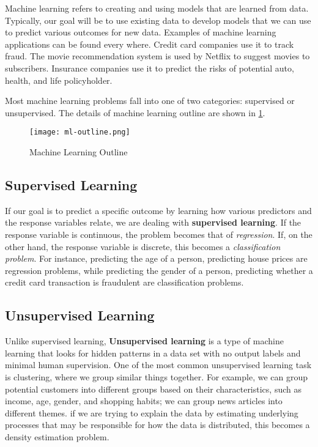 Machine learning refers to creating and using models that are learned from data.
Typically, our goal will be to use existing data to develop models that we can
use to predict various outcomes for new data. Examples of machine learning
applications can be found every where. Credit card companies use it to track
fraud.  The movie recommendation system is used by Netflix to suggest movies to
subscribers. Insurance companies use it to predict the risks of potential auto,
health, and life policyholder.

Most machine learning problems fall into one of two categories: supervised or
unsupervised. The details of machine learning outline are shown in
\ref{fig:ml-outline}.

\begin{figure}[H]\centering
    \texttt{[image: ml-outline.png]}
    \caption{Machine Learning Outline}
    \label{fig:ml-outline}
\end{figure}

\subsection{Supervised Learning}

If our goal is to predict a specific outcome by learning how various predictors
and the response variables relate, we are dealing with \textbf{supervised
learning}. If the response variable is continuous, the problem becomes that of
\textit{regression}. If, on the other hand, the response variable is discrete,
this becomes a \textit{classification problem}. For instance, predicting the age
of a person, predicting house prices are regression problems, while predicting
the gender of a person, predicting whether a credit card transaction is
fraudulent are classification problems.

\subsection{Unsupervised Learning}
Unlike supervised learning, \textbf{Unsupervised learning} is a type of machine
learning that looks for hidden patterns in a data set with no output labels and
minimal human supervision. One of the most common unsupervised learning task is
clustering, where we group similar things together. For example, we can group
potential customers into different groups based on their characteristics, such
as income, age, gender, and shopping habits; we can group news articles into
different themes. if we are trying to explain the data by estimating underlying
processes that may be responsible for how the data is distributed, this becomes
a density estimation problem.

